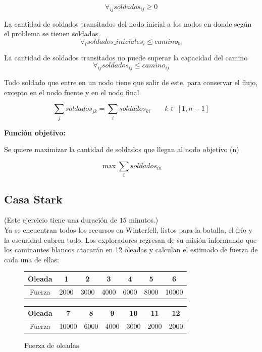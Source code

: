 \documentclass[a4paper,10pt,twocolumn]{article}
\theoremstyle{theorem}
\theoremstyle{definition}
\theoremstyle{remark}
\begin{document}
$$
\forall_{ij} soldados_{ij} \ge 0
$$

La cantidad de soldados transitados del nodo inicial a los nodos en donde según el problema se tienen soldados.
$$
\forall_{i} soldados\_iniciales_i \le camino_{0i}
$$

La cantidad de soldados transitados no puede superar la capacidad del camino
$$
\forall_{ij} soldados_{ij} \le camino_{ij}
$$

Todo soldado que entre en un nodo tiene que salir de este, para conservar el flujo, excepto en el nodo fuente y en el nodo final

$$
\sum_j soldados_{jk} = \sum_i soldados_{ki} \qquad k \in [1,n-1]
$$

\textbf{Función objetivo:}

Se quiere maximizar la cantidad de soldados que llegan al nodo objetivo (n)

$$
\max \sum_i soldados_{in}
$$


	\subsection{Casa Stark}\label{subsec:ejer_5}
(Este ejercicio tiene una duración de $15$ minutos.)\\

Ya se encuentran todos los recursos en Winterfell, listos para la batalla, el frío y la oscuridad cubren todo. Los exploradores regresan de su misión informando que los caminantes blancos atacarán en 12 oleadas y calculan el estimado de fuerza de cada una de ellas:

\begin{figure}[h!]%
	\begin{center}
		\begin{tabular}{|c|c|c|c|c|c|c|} \hline
		Oleada	& 1		& 2		& 3	    & 4		& 5		& 6		\\ \hline
		Fuerza	& 2000	& 3000	& 4000	& 6000	& 8000	& 10000	\\ \hline
		\end{tabular}
		
		\begin{tabular}{|c|c|c|c|c|c|c|} \hline
		Oleada	& 7		& 8		& 9	    & 10	& 11	& 12	\\ \hline
		Fuerza	& 10000	& 6000	& 4000	& 3000	& 2000	& 2000	\\ \hline
		\end{tabular}
	\caption{Fuerza de oleadas}\label{fig:ejer_5_1}
	\end{center}
\end{figure}
\end{document}
